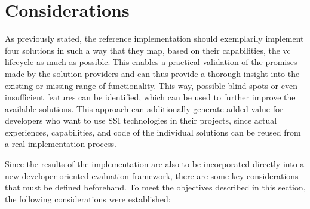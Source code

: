     \section{Considerations}\label{section: ri-considerations}
    As previously stated, the reference implementation should exemplarily implement four solutions in such a way that they map, based on their capabilities, the \ac{vc} lifecycle as much as possible. This enables a practical validation of the promises made by the solution providers and can thus provide a thorough insight into the existing or missing range of functionality. This way, possible blind spots or even insufficient features can be identified, which can be used to further improve the available solutions. This approach can additionally generate added value for developers who want to use \ac{SSI} technologies in their projects, since actual experiences, capabilities, and code of the individual solutions can be reused from a real implementation process.
    
    Since the results of the implementation are also to be incorporated directly into a new developer-oriented evaluation framework, there are some key considerations that must be defined beforehand. To meet the objectives described in this section, the following considerations were established:
    
